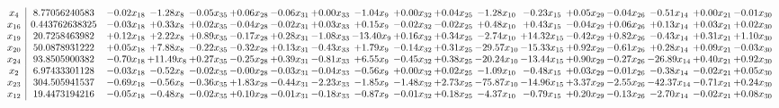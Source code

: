 \documentclass[9pt]{article}
\begin{document}
 \[\begin{array}{c| c c@{\hskip 2pt} c@{\hskip 2pt} c@{\hskip 2pt} c@{\hskip 2pt} c@{\hskip 2pt} c@{\hskip 2pt} c@{\hskip 2pt} c@{\hskip 2pt} c@{\hskip 2pt} c@{\hskip 2pt} c@{\hskip 2pt} c@{\hskip 2pt} c@{\hskip 2pt} c@{\hskip 2pt} c@{\hskip 2pt} c@{\hskip 2pt} }
 x_{4}   &  8.77056240583 & -0.02 x_{18} & -1.28 x_{8} & -0.05 x_{35} & +  0.06 x_{28} & -0.06 x_{31} & +  0.00 x_{33} & -1.04 x_{9} & +  0.00 x_{32} & +  0.04 x_{25} & -1.28 x_{10} & -0.23 x_{15} & +  0.05 x_{29} & -0.04 x_{26} & -0.51 x_{14} & +  0.00 x_{21} & -0.01 x_{30}\\
 x_{16}   &  0.443762638325 & -0.03 x_{18} & +  0.33 x_{8} & +  0.02 x_{35} & -0.04 x_{28} & -0.02 x_{31} & +  0.03 x_{33} & +  0.15 x_{9} & -0.02 x_{32} & -0.02 x_{25} & +  0.48 x_{10} & +  0.43 x_{15} & -0.04 x_{29} & +  0.06 x_{26} & +  0.13 x_{14} & +  0.03 x_{21} & +  0.02 x_{30}\\
 x_{19}   &  20.7258463982 & +  0.12 x_{18} & +  2.22 x_{8} & +  0.89 x_{35} & -0.17 x_{28} & +  0.28 x_{31} & -1.08 x_{33} & -13.40 x_{9} & +  0.16 x_{32} & +  0.34 x_{25} & -2.74 x_{10} & + 14.32 x_{15} & -0.42 x_{29} & +  0.82 x_{26} & -0.43 x_{14} & +  0.31 x_{21} & +  1.10 x_{30}\\
 x_{20}   &  50.0878931222 & +  0.05 x_{18} & +  7.88 x_{8} & -0.22 x_{35} & -0.32 x_{28} & +  0.13 x_{31} & -0.43 x_{33} & +  1.79 x_{9} & -0.14 x_{32} & +  0.31 x_{25} & -29.57 x_{10} & -15.33 x_{15} & +  0.92 x_{29} & -0.61 x_{26} & +  0.28 x_{14} & +  0.09 x_{21} & -0.03 x_{30}\\
 x_{24}   &  93.8505900382 & -0.70 x_{18} & + 11.49 x_{8} & +  0.27 x_{35} & -0.25 x_{28} & +  0.39 x_{31} & -0.81 x_{33} & +  6.55 x_{9} & -0.45 x_{32} & +  0.38 x_{25} & -20.24 x_{10} & -13.44 x_{15} & +  0.90 x_{29} & -0.27 x_{26} & -26.89 x_{14} & +  0.40 x_{21} & +  0.92 x_{30}\\
 x_{2}   &  6.97433301128 & -0.03 x_{18} & -0.52 x_{8} & -0.02 x_{35} & -0.00 x_{28} & -0.03 x_{31} & -0.04 x_{33} & -0.56 x_{9} & +  0.00 x_{32} & +  0.02 x_{25} & -1.09 x_{10} & -0.48 x_{15} & +  0.03 x_{29} & -0.01 x_{26} & -0.38 x_{14} & -0.02 x_{21} & +  0.05 x_{30}\\
 x_{23}   &  304.505941537 & -0.69 x_{18} & -0.56 x_{8} & -0.36 x_{35} & +  1.83 x_{28} & -0.44 x_{31} & -2.23 x_{33} & -1.85 x_{9} & -1.48 x_{32} & +  2.73 x_{25} & -75.87 x_{10} & -14.96 x_{15} & +  3.37 x_{29} & -2.55 x_{26} & -42.37 x_{14} & -0.71 x_{21} & +  0.24 x_{30}\\
 x_{12}   &  19.4473194216 & -0.05 x_{18} & -0.48 x_{8} & -0.02 x_{35} & +  0.10 x_{28} & -0.01 x_{31} & -0.18 x_{33} & -0.87 x_{9} & -0.01 x_{32} & +  0.18 x_{25} & -4.37 x_{10} & -0.79 x_{15} & +  0.20 x_{29} & -0.13 x_{26} & -2.70 x_{14} & -0.02 x_{21} & +  0.08 x_{30}\\

\end{array}\]
\end{document}
